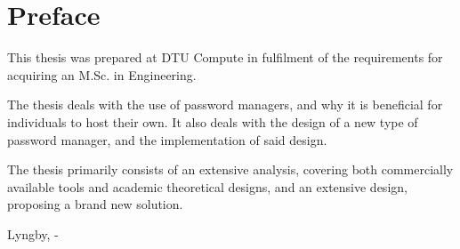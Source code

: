 \chapter{Preface}

This thesis was prepared at DTU Compute in fulfilment of the requirements for acquiring an M.Sc. in Engineering.

The thesis deals with the use of password managers, and why it is beneficial for individuals to host their own. It also deals with the design of a new type of password manager, and the implementation of said design.

The thesis primarily consists of an extensive analysis, covering both commercially available tools and academic theoretical designs, and an extensive design, proposing a brand new solution.
\vspace{20mm}
\begin{center}
    \hspace{20mm} Lyngby, \thesishandin-\thesisyear
    \vspace{5mm}
    \newline
\end{center}
\begin{flushright}
    \thesisauthor
\end{flushright}
